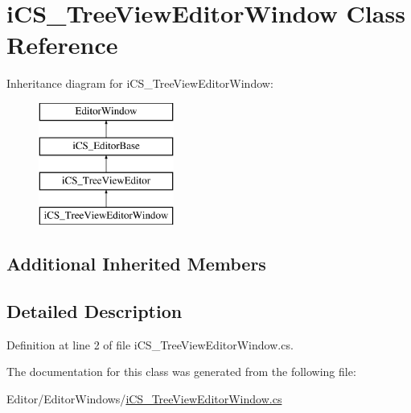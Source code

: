 \hypertarget{classi_c_s___tree_view_editor_window}{\section{i\+C\+S\+\_\+\+Tree\+View\+Editor\+Window Class Reference}
\label{classi_c_s___tree_view_editor_window}
}
Inheritance diagram for i\+C\+S\+\_\+\+Tree\+View\+Editor\+Window\+:\begin{figure}[H]
\begin{center}
\leavevmode
\includegraphics[height=4.000000cm]{classi_c_s___tree_view_editor_window}
\end{center}
\end{figure}
\subsection*{Additional Inherited Members}


\subsection{Detailed Description}


Definition at line 2 of file i\+C\+S\+\_\+\+Tree\+View\+Editor\+Window.\+cs.



The documentation for this class was generated from the following file\+:\begin{DoxyCompactItemize}
\item 
Editor/\+Editor\+Windows/\hyperlink{i_c_s___tree_view_editor_window_8cs}{i\+C\+S\+\_\+\+Tree\+View\+Editor\+Window.\+cs}\end{DoxyCompactItemize}
